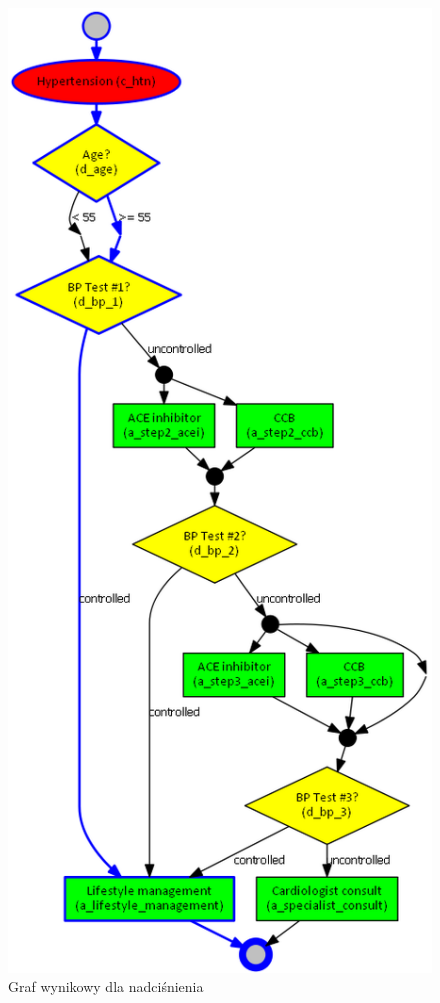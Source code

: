 \begin{figure}[H]
\centering
\includegraphics[scale=0.45]{img/rozwiazanie1htn-ver-3.png}
\caption{Graf wynikowy dla nadciśnienia}
\label{fig:rozw_htn}
\end{figure}


